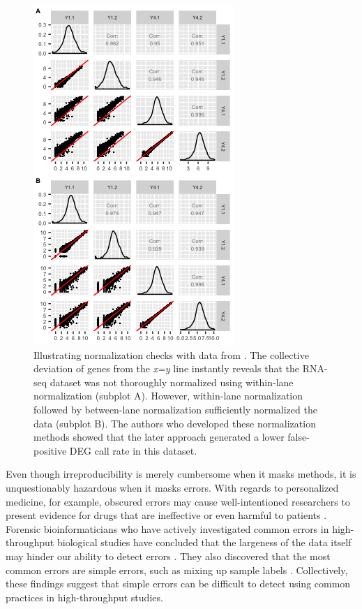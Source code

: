 \documentclass[11pt,a4paper,oldfontcommands,openany]{memoir}
\numberwithin{equation}{section} %
\begin{document}
\begin{figure}[!tpb]
\begin{framed}
\centerline{\includegraphics[width=0.8\columnwidth]{MakeFigures/yeastWithinBetween.jpg}}
\end{framed}
\caption{Illustrating normalization checks with data from  \cite{Risso}. The collective deviation of genes from the \textit{x=y} line instantly reveals that the RNA-seq dataset was not thoroughly normalized using within-lane normalization (subplot A). However, within-lane normalization followed by between-lane normalization sufficiently normalized the data (subplot B). The authors who developed these normalization methods showed that the later approach generated a lower false-positive DEG call rate in this dataset.
\label{yeastWithinBetween}}
\end{figure}

Even though irreproducibility is merely cumbersome when it masks methods, it is unquestionably hazardous when it masks errors. With regards to personalized medicine, for example, obscured errors may cause well-intentioned researchers to present evidence for drugs that are ineffective or even harmful to patients \citep{Baggerly}. Forensic bioinformaticians who have actively investigated common errors in high-throughput biological studies have concluded that the largeness of the data itself may hinder our ability to detect errors \citep{Baggerly}. They also discovered that the most common errors are simple errors, such as mixing up sample labels \citep{Baggerly}. Collectively, these findings suggest that simple errors can be difficult to detect using common practices in high-throughput studies.
\end{document}
